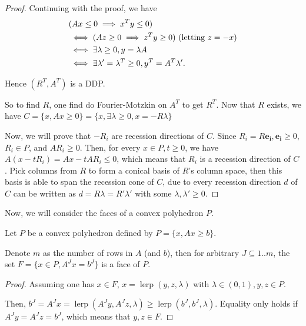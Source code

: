 \begin{proof}
Continuing with the proof, we have
\begin{align*}
  &(Ax \le 0 \implies x^{T}y \le 0)\\
  &\iff(Az \ge  0 \implies z^{T}y \ge  0) \text{ (letting \( z = -x \))}\\
  &\iff \exists \lambda \ge 0,  y = \lambda A\\
  &\iff \exists  \lambda' = \lambda^{T} \ge 0, y^{T} = A^{T}\lambda'
.\end{align*}

Hence \( (R^{T}, A^{T}) \) is a DDP.

So to find \( R \), one find do Fourier-Motzkin on \( A^{T} \) to get \( R^{T}
\). Now that \( R \) exists, we have \( C = \{x, Ax \ge 0\} = \{x, \exists
\lambda \ge 0, x = -R\lambda\}  \)

Now, we will prove that \( -R_{i} \) are recession directions of \( C \).
Since \( R_{i} = R\mathbf{e_{i}}, \mathbf{e_{i}} \ge 0 \), \( R_{i} \in P \),
and \( AR_{i} \ge  0 \). Then, for every \( x \in P, t \ge 0 \), we have \( A(x
- tR_{i}) = Ax - tAR_{i} \le  0 \), which means that \( R_{i} \) is a recession
direction of \( C \). Pick columns from \( R \) to form a conical basis of \( R \)'s
column space, then this basis is able to span the recession cone of \( C \), due
to every recession direction \( d \) of \( C \) can be written as \( d =
R\lambda = R'\lambda' \) with some \( \lambda, \lambda' \ge  0 \).
\end{proof}


Now, we will consider the faces of a convex polyhedron \( P \).

\begin{theorem}
  Let \( P \) be a convex polyhedron defined by \( P = \{x, Ax \ge  b\}   \).
  
  Denote \( m \) as the number of rows in \( A \) (and \( b \)), then for
  arbitrary \( J \subseteq 1..m \), the set \( F = \{x \in P, A^{J}x = b^{J}\}
  \) is a face of \( P \).
\end{theorem}

\begin{proof}
  Assuming one has \( x \in F \), \( x = \operatorname{lerp}(y, z, \lambda) \)
  with \( \lambda \in (0, 1), y, z \in P \).

  Then, \( b^{J} = A^{J}x = \operatorname{lerp}(A^{J}y, A^{J}z, \lambda) \ge
  \operatorname{lerp}(b^{J}, b^{J}, \lambda) \). Equality only holds if \(
  A^{J}y = A^{J}z = b^{J} \), which means that \( y, z \in F \).
\end{proof}

